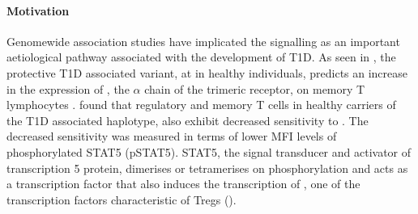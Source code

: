\paragraph{Motivation}
Genomewide association studies have implicated the  signalling as an important aetiological pathway associated with the development of \gls{T1D}.  
As seen in , the protective T1D associated  variant, at  in healthy individuals, predicts an increase in the expression of , the $\alpha$ chain of the trimeric  receptor, on memory \positive T lymphocytes \citep{Dendrou:2008gc,Dendrou:2009dv}.
\citet{Garg:2012jr} found that regulatory and memory \positive T cells in healthy carriers of the T1D associated  haplotype,
also exhibit decreased sensitivity to .
The decreased sensitivity was measured in terms of lower MFI levels of phosphorylated STAT5 (pSTAT5).
STAT5, the signal transducer and activator of transcription 5 protein, dimerises or tetramerises on phosphorylation and acts as a transcription factor that also induces the transcription of , one of the transcription factors characteristic of \glspl{Treg} ().


